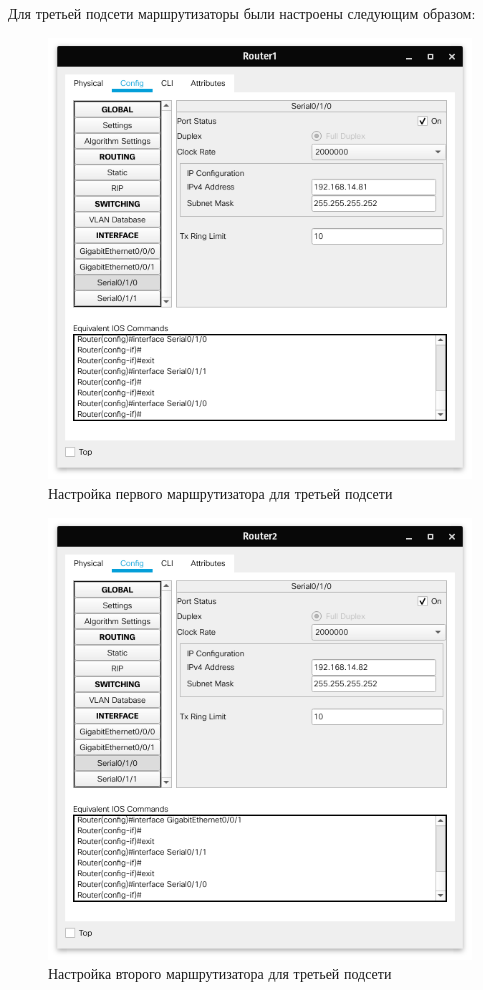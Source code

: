 Для третьей подсети маршрутизаторы были настроены следующим образом:
\begin{figure}[H]
    \centering
    \includegraphics[width=0.8\linewidth]{images/src03.png}
    \caption{Настройка первого маршрутизатора для третьей подсети}%
    \label{fig:servers3_1}
\end{figure}
\begin{figure}[H]
    \centering
    \includegraphics[width=0.8\linewidth]{images/src04.png}
    \caption{Настройка второго маршрутизатора для третьей подсети}%
    \label{fig:servers3_2}
\end{figure}

